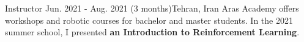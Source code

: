 \resumeSubheadingReza
{Instructor}{}
{Jun. 2021 - Aug. 2021 (3 months)}{Tehran, Iran}
{Aras Academy offers workshops and robotic courses for bachelor and master students. In the 2021 summer school, I presented \textbf{an Introduction to Reinforcement Learning}.}